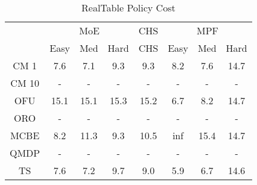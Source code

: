 \begin{table}[]
\centering
\begin{tabular}{|c|c|c|c|c|c|c|c|}
\hline
& \multicolumn{3}{c|}{MoE} & CHS & \multicolumn{3}{c|}{MPF} 
 \\ 
 & Easy & Med & Hard & CHS & Easy & Med & Hard\\\hline
CM 1 &   7.6 &   7.1 &   9.3 &   9.3 &   8.2 &   7.6 &  14.7\\
\hline
CM 10 & - & - & - & - & - & - & -\\
\hline
OFU &  15.1 &  15.1 &  15.3 &  15.2 &   6.7 &   8.2 &  14.7\\
\hline
ORO & - & - & - & - & - & - & -\\
\hline
MCBE &   8.2 &  11.3 &   9.3 &  10.5 &   inf &  15.4 &  14.7\\
\hline
QMDP & - & - & - & - & - & - & -\\
\hline
TS &   7.6 &   7.2 &   9.7 &   9.0 &   5.9 &   6.7 &  14.6\\
\hline
\end{tabular}
\caption{RealTable Policy Cost}
\label{tab:experiment_RealTable_cost}
\end{table}
